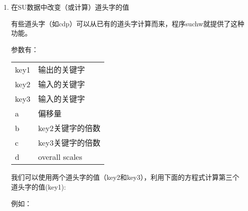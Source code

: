 \begin{enumerate}
	$$i = itr + d$$
	$$val(key) = a + b *  \left( i \% j\right)   + c * \left( i / j \right) )$$
	这里itr是道号（注意：第一道是itr=0,而非1），\%表示取余数，/表示除法。\par
	例如，我们可以设定头五道的道头字sx=6400,第二个5道中sx=6300,依次类推，每5道递减100：\par
	\par
	另一个例子，我们设置每5道的offset的值为200：200：1000，命令格式为：\par
	\par
	我们可以只使用一个sushw命令就可以完成上面3个操作：
\begin{lstlisting}[language=python] 
sushw < data.su key=dt,sx,offset a=2000,6400,200 b=0,0,200 c=0,-100,0 j=0,5,5 > newdata.su
\end{lstlisting}
	下面是一个实际的例子，tracl从1开始，每隔100道增加1；cdp从1开始，每道增加1，一直增加到100，然后重复从1开始；offset同tracl,只是从0开始；sx同cdp；sy同offset；ns全部设为495；dt全部设为1000：
	\begin{lstlisting}[language=python] 
sushw < filename.su key=tracl,cdp,offset,sx,sy,ns,dt a=1,1,0,1,0,495,1000 b=0,1,0,1,0,0,0 c=1,0,1,0,1,0,0 j=100,100,100,100,100,0,0 > filename_new.su
	\end{lstlisting}
	\item[suchw] 在SU数据中改变（或计算）道头字的值\par
	有些道头字（如cdp）可以从已有的道头字计算而来，程序suchw就提供了这种功能。\par
	参数有：\par
	\begin{tabular}{ll}
		\toprule
		key1 & 输出的关键字\\
		key2 & 输入的关键字\\
		key3 & 输入的关键字\\
		a & 偏移量\\
		b & key2关键字的倍数\\	
		c & key3关键字的倍数\\	
		d & overall scales\\
		\bottomrule
	\end{tabular}\par
	我们可以使用两个道头字的值（key2和key3），利用下面的方程式计算第三个道头字的值(key1):\par
	\par
	例如：\par

\end{enumerate}
